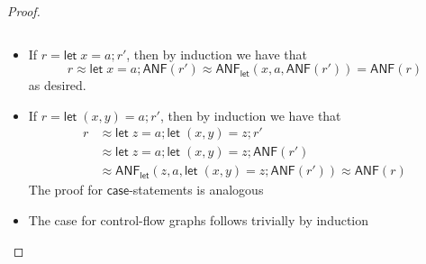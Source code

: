 \documentclass[acmsmall,screen,review]{acmart}
\newcommand{\ms}[1]{\ensuremath{\mathsf{#1}}}
\newcommand{\letstmt}[3]{\ensuremath{\ms{let}\;#1 = #2; #3}}
\newcommand{\teqv}{\approx}
\newcommand{\toanf}[1]{\ms{ANF}(#1)}
\newcommand{\letanf}[3]{\ms{ANF}_{\ms{let}}(#1, #2, #3)}
\begin{document}
\begin{proof}
\begin{itemize}
\begin{equation}
    \end{equation}
    \item If $r = \letstmt{x}{a}{r'}$, then by induction we have that
    \begin{equation}
      r \teqv \letstmt{x}{a}{\toanf{r'}} \teqv \letanf{x}{a}{\toanf{r'}} = \toanf{r}
    \end{equation}
    as desired.
    \item If $r = \letstmt{(x, y)}{a}{r'}$, then by induction we have that
    \begin{equation}
      \begin{aligned}
        r & \teqv \letstmt{z}{a}{\letstmt{(x, y)}{z}{r'}} \\
          & \teqv \letstmt{z}{a}{\letstmt{(x, y)}{z}{\ms{ANF}(r')}} \\
          & \teqv \letanf{z}{a}{\letstmt{(x, y)}{z}{\ms{ANF}(r')}}
            \teqv \toanf{r}
      \end{aligned}
    \end{equation}
    The proof for \ms{case}-statements is analogous
    \item The case for control-flow graphs follows trivially by induction
  \end{itemize}
\end{proof}

\ssaconversion*

\label{proof:ssa-conversion}
\end{document}
